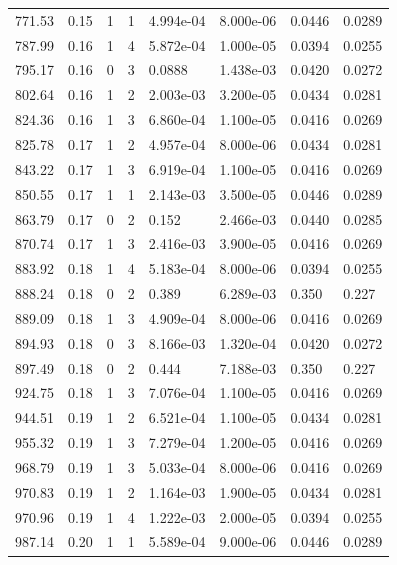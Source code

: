 \documentclass[preview]{standalone}
\begin{document}
{{{\begin{tabular}{L{1.2cm}C{1.2cm} C{0.3cm}C{0.5cm} C{1.4cm}C{1.4cm} C{1.4cm}C{1.4cm}}
  771.53  &  0.15  & 1     &  1 &  4.994e-04  & 8.000e-06  & 0.0446 &  0.0289   \\ 
  787.99  &  0.16  & 1     &  4 &  5.872e-04  & 1.000e-05  & 0.0394 &  0.0255   \\ 
  795.17  &  0.16  & 0     &  3 &  0.0888  & 1.438e-03  & 0.0420 &  0.0272   \\ 
  802.64  &  0.16  & 1     &  2 &  2.003e-03  & 3.200e-05  & 0.0434 &  0.0281   \\ 
  824.36  &  0.16  & 1     &  3 &  6.860e-04  & 1.100e-05  & 0.0416 &  0.0269   \\ 
  825.78  &  0.17  & 1     &  2 &  4.957e-04  & 8.000e-06  & 0.0434 &  0.0281   \\ 
  843.22  &  0.17  & 1     &  3 &  6.919e-04  & 1.100e-05  & 0.0416 &  0.0269   \\ 
  850.55  &  0.17  & 1     &  1 &  2.143e-03  & 3.500e-05  & 0.0446 &  0.0289   \\ 
  863.79  &  0.17  & 0     &  2 &  0.152  & 2.466e-03  & 0.0440 &  0.0285   \\ 
  870.74  &  0.17  & 1     &  3 &  2.416e-03  & 3.900e-05  & 0.0416 &  0.0269   \\ 
  883.92  &  0.18  & 1     &  4 &  5.183e-04  & 8.000e-06  & 0.0394 &  0.0255   \\ 
  888.24  &  0.18  & 0     &  2 &  0.389  & 6.289e-03  & 0.350 &  0.227   \\ 
  889.09  &  0.18  & 1     &  3 &  4.909e-04  & 8.000e-06  & 0.0416 &  0.0269   \\ 
  894.93  &  0.18  & 0     &  3 &  8.166e-03  & 1.320e-04  & 0.0420 &  0.0272   \\ 
  897.49  &  0.18  & 0     &  2 &  0.444  & 7.188e-03  & 0.350 &  0.227   \\ 
  924.75  &  0.18  & 1     &  3 &  7.076e-04  & 1.100e-05  & 0.0416 &  0.0269   \\ 
  944.51  &  0.19  & 1     &  2 &  6.521e-04  & 1.100e-05  & 0.0434 &  0.0281   \\ 
  955.32  &  0.19  & 1     &  3 &  7.279e-04  & 1.200e-05  & 0.0416 &  0.0269   \\ 
  968.79  &  0.19  & 1     &  3 &  5.033e-04  & 8.000e-06  & 0.0416 &  0.0269   \\ 
  970.83  &  0.19  & 1     &  2 &  1.164e-03  & 1.900e-05  & 0.0434 &  0.0281   \\ 
  970.96  &  0.19  & 1     &  4 &  1.222e-03  & 2.000e-05  & 0.0394 &  0.0255   \\ 
  987.14  &  0.20  & 1     &  1 &  5.589e-04  & 9.000e-06  & 0.0446 &  0.0289   \\ 

\end{tabular}}}}
\end{document}
